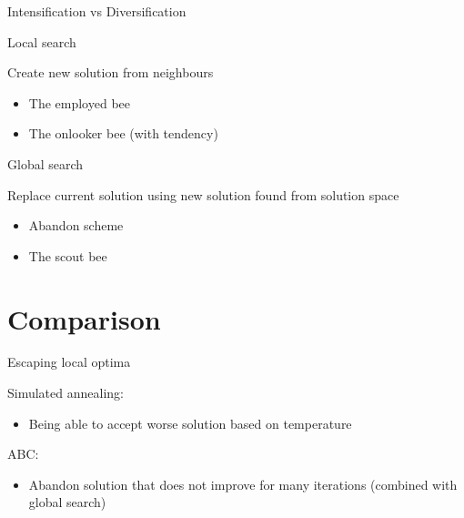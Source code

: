\documentclass[14pt,ignorenonframetext,compress]{beamer}
\providecommand{\tightlist}{%
  \setlength{\itemsep}{0pt}\setlength{\parskip}{0pt}}
\begin{document}
\begin{frame}{Intensification vs Diversification}
\protect\hypertarget{intensification-vs-diversification}{}

\begin{block}{Local search}

Create new solution from neighbours

\begin{itemize}
\tightlist
\item
  The employed bee
\item
  The onlooker bee (with tendency)
\end{itemize}

\pause

\end{block}

\begin{block}{Global search}

Replace current solution using new solution found from solution space

\begin{itemize}
\tightlist
\item
  Abandon scheme
\item
  The scout bee
\end{itemize}

\end{block}

\end{frame}

\hypertarget{comparison}{%
\section{Comparison}\label{comparison}}

\begin{frame}{Escaping local optima}
\protect\hypertarget{escaping-local-optima}{}

Simulated annealing:

\begin{itemize}
\tightlist
\item
  Being able to accept worse solution based on temperature
\end{itemize}

\pause

ABC:

\begin{itemize}
\tightlist
\item
  Abandon solution that does not improve for many iterations (combined
  with global search)
\end{itemize}

\end{frame}
\end{document}
